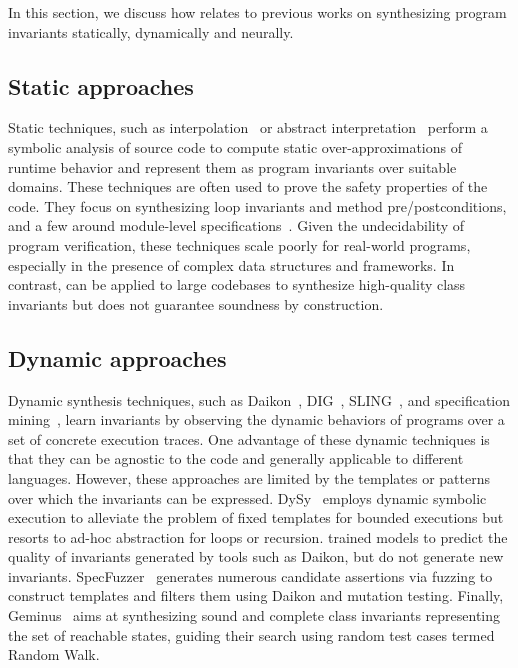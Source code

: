 
In this section, we discuss how \tech relates to previous works on synthesizing program invariants statically, dynamically and neurally.


\subsection{Static approaches}
Static techniques, such as interpolation~\cite{mcmillan2004interpolants} or abstract interpretation~\cite{cousot1977abstract} perform a symbolic analysis of source code to compute static over-approximations of runtime behavior and represent them as program invariants over suitable domains.
These techniques are often used to prove the safety properties of the code.
They focus on synthesizing loop invariants and method pre/postconditions, and a few around module-level specifications~\cite{lahiri-cav09}. 
Given the undecidability of program verification, these techniques scale poorly for real-world programs, especially in the presence of complex data structures and frameworks. 
In contrast, \tech can be applied to large codebases to synthesize high-quality class invariants but does not guarantee soundness by construction. 


\subsection{Dynamic approaches}
Dynamic synthesis techniques, such as Daikon~\cite{ernst2007daikon}, DIG~\cite{nguyen2012dig}, SLING~\cite{le2019sling}, and specification mining~\cite{ammons2002}, learn invariants by observing the dynamic behaviors of programs over a set of concrete execution traces. 
One advantage of these dynamic techniques is that they can be agnostic to the code and generally applicable to different languages. 
However, these approaches are limited by the templates or patterns over which the invariants can be expressed. 
DySy~\cite{dysy} employs dynamic symbolic execution to alleviate the problem of fixed templates for bounded executions but resorts to ad-hoc abstraction for loops or recursion. 
\citet{hellendoorn2019are} trained models to predict the quality of invariants generated by tools such as Daikon, but do not generate new invariants. 
SpecFuzzer~\cite{facundo2022specfuzzer} generates numerous candidate assertions via fuzzing to construct templates and filters them using Daikon and mutation testing. 
Finally, Geminus~\citep{boockmann2024geminius} aims at synthesizing sound and complete class invariants representing the set of reachable states, guiding their search using random test cases termed Random Walk.

